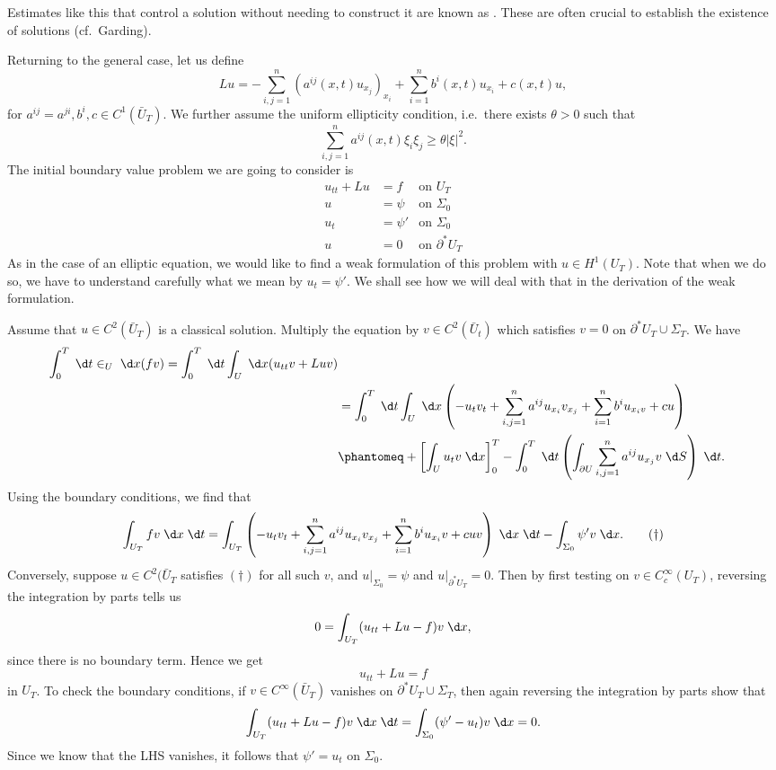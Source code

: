 \documentclass[a4paper]{article}
\begin{document}
Estimates like this that control a solution without needing to construct it are known as . These are often crucial to establish the existence of solutions (cf.\ Garding).

Returning to the general case, let us define
\[
  Lu = -\sum_{i, j = 1}^n (a^{ij}(x, t) u_{x_j})_{x_i} + \sum_{i = 1}^n b^i(x, t) u_{x_i} + c(x, t) u,
\]
for $a^{ij} = a^{ji}, b^i, c \in C^1(\bar{U}_T)$. We further assume the uniform ellipticity condition, i.e.\ there exists $\theta > 0$ such that
\[
  \sum_{i, j = 1}^n a^{ij}(x, t) \xi_i \xi_j \geq \theta |\xi|^2.
\]
The initial boundary value problem we are going to consider is
\begin{align*}
  u_{tt} + Lu &= f&\text{on }U_T\\
  u &= \psi &\text{on }\Sigma_0\\
  u_t &= \psi' & \text{on }\Sigma_0\\
  u &= 0 &\text{on } \partial^* U_T
\end{align*}
As in the case of an elliptic equation, we would like to find a weak formulation of this problem with $u \in H^1(U_T)$. Note that when we do so, we have to understand carefully what we mean by $u_t = \psi'$. We shall see how we will deal with that in the derivation of the weak formulation.

Assume that $u \in C^2(\bar{U}_T)$ is a classical solution. Multiply the equation by $v \in C^2(\bar{U}_t)$ which satisfies $v = 0$ on $\partial^* U_T \cup \Sigma_T$. We have
\begin{align*}
  \int_0^T \;\d t \in_U \;\d x (fv) = \int_0^T \;\d t\int_U \;\d x (u_{tt}v + Luv)\\
  &= \int_0^T\;\d t \int_U \;\d x \left(-u_t v_t + \sum_{i, j = 1}^n a^{ij} u_{x_i} v_{x_j} + \sum_{i = 1}^n b^i u_{x_i v} + cu\right)\\
  &\phantomeq + \left[\int_U u_t v \;\d x\right]_0^T - \int_0^T \;\d t \left(\int_{\partial U} \sum_{i, j = 1}^n a^{ij} u_{x_j} v\;\d S\right)\;\d t.
\end{align*}
Using the boundary conditions, we find that
\[
  \int_{U_T} fv\;\d x \;\d t = \int_{U_T} \left(-u_t v_t + \sum_{i, j = 1}^n a^{ij} u_{x_i} v_{x_j} + \sum_{i = 1}^n b^i u_{x_i} v + cuv \right)\;\d x\;\d t - \int_{\Sigma_0} \psi' v\;\d x.\tag{$\dagger$}
\]
Conversely, suppose $u \in C^2(\bar{U}_T$ satisfies $(\dagger)$ for all such $v$, and $u|_{\Sigma_0} = \psi$ and $u|_{\partial^* U_T} = 0$. Then by first testing on $v \in C_c^\infty(U_T)$, reversing the integration by parts tells us
\[
  0 = \int_{U_T} (u_{tt} + Lu - f)v\;\d x,
\]
since there is no boundary term. Hence we get
\[
  u_{tt} + Lu = f
\]
in $U_T$. To check the boundary conditions, if $v \in C^\infty(\bar{U}_T)$ vanishes on $\partial^*U_T \cup \Sigma_T$, then again reversing the integration by parts show that
\[
  \int_{U_T} (u_{tt} + Lu - f) v\;\d x \;\d t = \int_{\Sigma_0} (\psi' - u_t) v\;\d x = 0.
\]
Since we know that the LHS vanishes, it follows that $\psi' = u_t$ on $\Sigma_0$.
\end{document}
